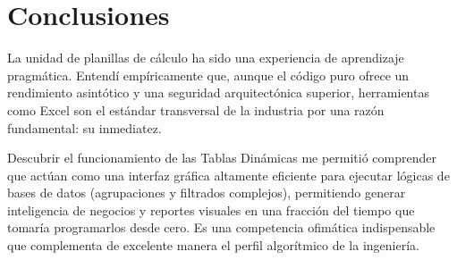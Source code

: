\section{Conclusiones}

La unidad de planillas de cálculo ha sido una experiencia de aprendizaje pragmática. Entendí empíricamente que, aunque el código puro ofrece un rendimiento asintótico y una seguridad arquitectónica superior, herramientas como Excel son el estándar transversal de la industria por una razón fundamental: su inmediatez.

Descubrir el funcionamiento de las Tablas Dinámicas me permitió comprender que actúan como una interfaz gráfica altamente eficiente para ejecutar lógicas de bases de datos (agrupaciones y filtrados complejos), permitiendo generar inteligencia de negocios y reportes visuales en una fracción del tiempo que tomaría programarlos desde cero. Es una competencia ofimática indispensable que complementa de excelente manera el perfil algorítmico de la ingeniería.

